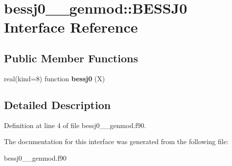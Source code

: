 \hypertarget{interfacebessj0____genmod_1_1_b_e_s_s_j0}{\section{bessj0\+\_\+\+\_\+genmod\+:\+:B\+E\+S\+S\+J0 Interface Reference}
\label{interfacebessj0____genmod_1_1_b_e_s_s_j0}
}
\subsection*{Public Member Functions}
\begin{DoxyCompactItemize}
\item 
\hypertarget{interfacebessj0____genmod_1_1_b_e_s_s_j0_a7549afea69d90c27b191b66cebc01dc7}{real(kind=8) function {\bfseries bessj0} (X)}\label{interfacebessj0____genmod_1_1_b_e_s_s_j0_a7549afea69d90c27b191b66cebc01dc7}

\end{DoxyCompactItemize}


\subsection{Detailed Description}


Definition at line 4 of file bessj0\+\_\+\+\_\+genmod.\+f90.



The documentation for this interface was generated from the following file\+:\begin{DoxyCompactItemize}
\item 
bessj0\+\_\+\+\_\+genmod.\+f90\end{DoxyCompactItemize}
